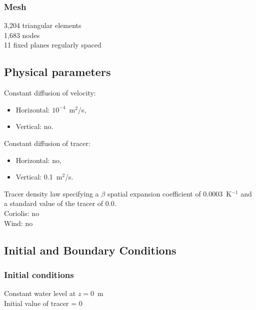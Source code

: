 \subsubsection{Mesh}
3,204 triangular elements\\
1,683 nodes\\
11 fixed planes regularly spaced
%
%
%
\subsection{Physical parameters}
%
Constant diffusion of velocity:
\begin{itemize}
\item Horizontal: $10^{-4}$~m$^2$/s,
\item Vertical: no.
\end{itemize}
Constant diffusion of tracer: 
\begin{itemize}
\item Horizontal: no,
\item Vertical: 0.1~m$^2$/s.
\end{itemize}
Tracer density law specifying a $\beta$ spatial expansion coefficient of
0.0003~K$^{-1}$ and a standard value of the tracer of 0.0.\\
Coriolis: no\\
Wind: no
%
%
%
%
%
%
\subsection{Initial and Boundary Conditions}
%
\subsubsection{Initial conditions}
Constant water level at $z = 0$~m\\
Initial value of tracer = 0\\
